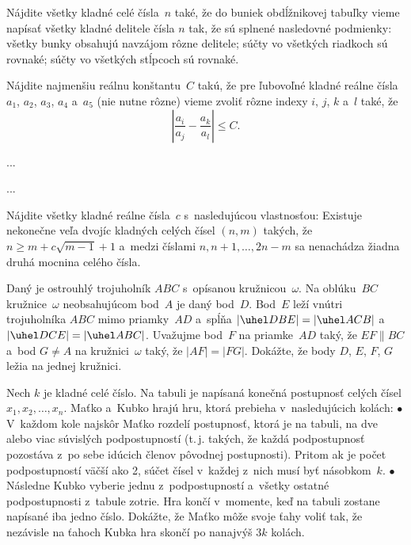 {%
Nájdite všetky kladné celé čísla~$n$ také, že do buniek obdĺžnikovej tabuľky vieme napísať všetky kladné delitele čísla $n$ tak, že sú splnené nasledovné podmienky:
 \ite{$\bullet$} všetky bunky obsahujú navzájom rôzne delitele;
 \ite{$\bullet$} súčty vo všetkých riadkoch sú rovnaké;
 \ite{$\bullet$} súčty vo všetkých stĺpcoch sú rovnaké.
}

{%
Nájdite najmenšiu reálnu konštantu~$C$ takú, že pre ľubovoľné kladné reálne čísla $a_1$, $a_2$, $a_3$, $a_4$ a~$a_5$ (nie nutne rôzne) vieme zvoliť rôzne indexy $i$, $j$, $k$ a~$l$ také, že $$\left|\frac{a_i}{a_j}-\frac{a_k}{a_l}\right| \le C.$$}

{%
...}

{%
...}

{%
Nájdite všetky kladné reálne čísla~$c$ s~nasledujúcou vlastnosťou: Existuje nekonečne veľa dvojíc kladných celých čísel $(n,m)$ takých, že $n\ge m+c\sqrt{m-1}+1$ a~medzi číslami $n,n+1,\dots, 2n-m$ sa nenachádza žiadna druhá mocnina celého čísla.}

{%
Daný je ostrouhlý trojuholník $ABC$ s~opísanou kružnicou~$\omega$. Na oblúku~$BC$ kružnice~$\omega$ neobsahujúcom bod~$A$ je daný bod~$D$. Bod~$E$ leží vnútri trojuholníka $ABC$ mimo priamky~$AD$ a~spĺňa $|\uhel DBE|=|\uhel ACB|$ a~$|\uhel DCE|=|\uhel ABC|$. Uvažujme bod~$F$ na priamke~$AD$ taký, že $EF\parallel BC$ a~bod $G\ne A$ na kružnici~$\omega$ taký, že $|AF|=|FG|$. Dokážte, že body $D$, $E$, $F$, $G$ ležia na jednej kružnici.}

{%
Nech $k$ je kladné celé číslo. Na tabuli je napísaná konečná postupnosť celých čísel $x_1,x_2,\dots,x_n$. Maťko a~Kubko hrajú hru, ktorá prebieha v~nasledujúcich kolách:
\ite $\bullet$ V~každom kole najskôr Maťko rozdelí postupnosť, ktorá je na tabuli, na dve alebo viac súvislých podpostupností (t.\,j. takých, že každá podpostupnosť pozostáva z~po sebe idúcich členov pôvodnej postupnosti). Pritom ak je počet podpostupností väčší ako 2, súčet čísel v~každej z~nich musí byť násobkom~$k$.
\ite $\bullet$ Následne Kubko vyberie jednu z~podpostupností a~všetky ostatné podpostupnosti z~tabule zotrie.
\endgraf\noindent
Hra končí v~momente, keď na tabuli zostane napísané iba jedno číslo. Dokážte, že Maťko môže svoje ťahy voliť tak, že nezávisle na ťahoch Kubka hra skončí po nanajvýš $3k$ kolách.}


